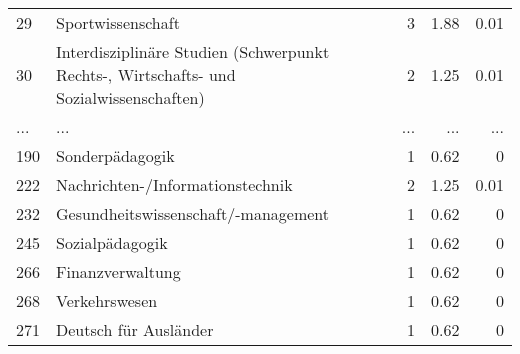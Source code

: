 \begin{longtable}{lXrrr}
        29 & \multicolumn{1}{X}{Sportwissenschaft} & %
          \num{3} &
          \num[round-mode=places,round-precision=2]{1,88} &
          \num[round-mode=places,round-precision=2]{0,01} \\
        30 & \multicolumn{1}{X}{Interdisziplinäre Studien (Schwerpunkt Rechts-, Wirtschafts- und Sozialwissenschaften)} & %
          \num{2} &
          \num[round-mode=places,round-precision=2]{1,25} &
          \num[round-mode=places,round-precision=2]{0,01} \\
       ... & ... & ... & ... & ... \\
        190 & \multicolumn{1}{X}{Sonderpädagogik} & %
          \num{1} &
          \num[round-mode=places,round-precision=2]{0,62} &
          \num[round-mode=places,round-precision=2]{0} \\

        222 & \multicolumn{1}{X}{Nachrichten-/Informationstechnik} & %
          \num{2} &
          \num[round-mode=places,round-precision=2]{1,25} &
          \num[round-mode=places,round-precision=2]{0,01} \\

        232 & \multicolumn{1}{X}{Gesundheitswissenschaft/-management} & %
          \num{1} &
          \num[round-mode=places,round-precision=2]{0,62} &
          \num[round-mode=places,round-precision=2]{0} \\

        245 & \multicolumn{1}{X}{Sozialpädagogik} & %
          \num{1} &
          \num[round-mode=places,round-precision=2]{0,62} &
          \num[round-mode=places,round-precision=2]{0} \\

        266 & \multicolumn{1}{X}{Finanzverwaltung} & %
          \num{1} &
          \num[round-mode=places,round-precision=2]{0,62} &
          \num[round-mode=places,round-precision=2]{0} \\

        268 & \multicolumn{1}{X}{Verkehrswesen} & %
          \num{1} &
          \num[round-mode=places,round-precision=2]{0,62} &
          \num[round-mode=places,round-precision=2]{0} \\

        271 & \multicolumn{1}{X}{Deutsch für Ausländer} & %
          \num{1} &
          \num[round-mode=places,round-precision=2]{0,62} &
          \num[round-mode=places,round-precision=2]{0} \\


\end{longtable}
